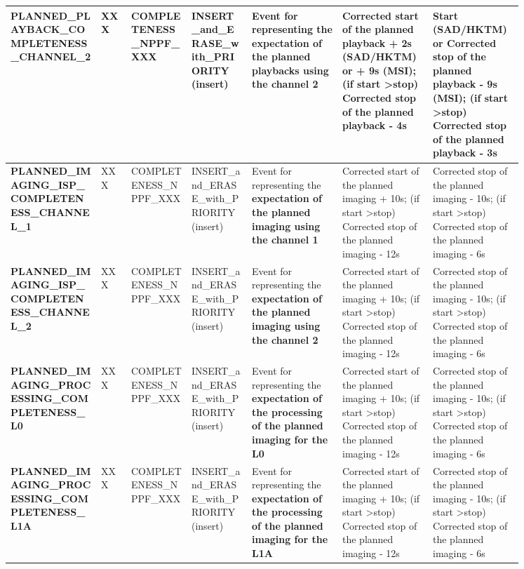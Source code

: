 \begin{landscape}
\begin{longtable}{|M{0.15\linewidth}|M{0.05\linewidth}|M{0.10\linewidth}|M{0.10\linewidth}|M{0.15\linewidth}|M{0.15\linewidth}|M{0.15\linewidth}|}
\textbf{PLANNED\_PLAYBACK\_COMPLETENESS\_CHANNEL\_2} & XXX & \- COMPLETENESS\_NPPF\_XXX & INSERT\_and\_ERASE\_with\_PRIORITY (insert) & Event for representing the \textbf{expectation of the planned playbacks using the channel 2} & Corrected start of the planned playback + 2s (SAD/HKTM) or + 9s (MSI); (if start \textgreater  stop) Corrected stop of the planned playback - 4s & Start (SAD/HKTM) or Corrected stop of the planned playback - 9s (MSI); (if start \textgreater  stop) Corrected stop of the planned playback - 3s \\ \hline
\textbf{PLANNED\_IMAGING\_ISP\_COMPLETENESS\_CHANNEL\_1} & XXX & \- COMPLETENESS\_NPPF\_XXX & INSERT\_and\_ERASE\_with\_PRIORITY (insert) & Event for representing the \textbf{expectation of the planned imaging using the channel 1} & Corrected start of the planned imaging + 10s; (if start \textgreater  stop) Corrected stop of the planned imaging - 12s & Corrected stop of the planned imaging - 10s; (if start \textgreater  stop) Corrected stop of the planned imaging - 6s \\ \hline
\textbf{PLANNED\_IMAGING\_ISP\_COMPLETENESS\_CHANNEL\_2} & XXX & \- COMPLETENESS\_NPPF\_XXX & INSERT\_and\_ERASE\_with\_PRIORITY (insert) & Event for representing the \textbf{expectation of the planned imaging using the channel 2} & Corrected start of the planned imaging + 10s; (if start \textgreater  stop) Corrected stop of the planned imaging - 12s & Corrected stop of the planned imaging - 10s; (if start \textgreater  stop) Corrected stop of the planned imaging - 6s \\ \hline
\textbf{PLANNED\_IMAGING\_PROCESSING\_COMPLETENESS\_L0} & XXX & \- COMPLETENESS\_NPPF\_XXX & INSERT\_and\_ERASE\_with\_PRIORITY (insert) & Event for representing the \textbf{expectation of the processing of the planned imaging for the L0} & Corrected start of the planned imaging + 10s; (if start \textgreater  stop) Corrected stop of the planned imaging - 12s & Corrected stop of the planned imaging - 10s; (if start \textgreater  stop) Corrected stop of the planned imaging - 6s \\ \hline
\textbf{PLANNED\_IMAGING\_PROCESSING\_COMPLETENESS\_L1A} & XXX & \- COMPLETENESS\_NPPF\_XXX & INSERT\_and\_ERASE\_with\_PRIORITY (insert) & Event for representing the \textbf{expectation of the processing of the planned imaging for the L1A} & Corrected start of the planned imaging + 10s; (if start \textgreater  stop) Corrected stop of the planned imaging - 12s & Corrected stop of the planned imaging - 10s; (if start \textgreater  stop) Corrected stop of the planned imaging - 6s \\ \hline

\end{longtable}
\end{landscape}
